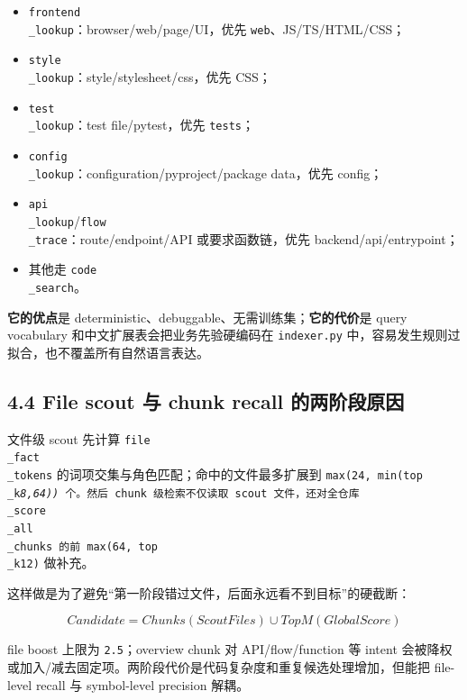 \documentclass[UTF8,12pt,openany]{ctexbook}
\begin{document}
\begin{itemize}
\item \texttt{frontend\\_lookup}：browser/web/page/UI，优先 \texttt{web}、JS/TS/HTML/CSS；
\item \texttt{style\\_lookup}：style/stylesheet/css，优先 CSS；
\item \texttt{test\\_lookup}：test file/pytest，优先 \texttt{tests}；
\item \texttt{config\\_lookup}：configuration/pyproject/package data，优先 config；
\item \texttt{api\\_lookup}/\texttt{flow\\_trace}：route/endpoint/API 或要求函数链，优先 backend/api/entrypoint；
\item 其他走 \texttt{code\\_search}。
\end{itemize}

\textbf{它的优点}是 deterministic、debuggable、无需训练集；\textbf{它的代价}是 query vocabulary 和中文扩展表会把业务先验硬编码在 \texttt{indexer.py} 中，容易发生规则过拟合，也不覆盖所有自然语言表达。\par

\subsection{4.4 File scout 与 chunk recall 的两阶段原因}

文件级 scout 先计算 \texttt{file\\_fact\\_tokens} 的词项交集与角色匹配；命中的文件最多扩展到 \texttt{max(24, min(top\\_k\emph{8,64))} 个。然后 chunk 级检索不仅读取 scout 文件，还对全仓库 \texttt{\\_score\\_all\\_chunks} 的前 \texttt{max(64, top\\_k}12)} 做补充。\par

这样做是为了避免“第一阶段错过文件，后面永远看不到目标”的硬截断：\par

\[
Candidate = Chunks(ScoutFiles) \cup TopM(GlobalScore)
\]

file boost 上限为 \texttt{2.5}；overview chunk 对 API/flow/function 等 intent 会被降权或加入/减去固定项。两阶段代价是代码复杂度和重复候选处理增加，但能把 file-level recall 与 symbol-level precision 解耦。\par
\end{document}
